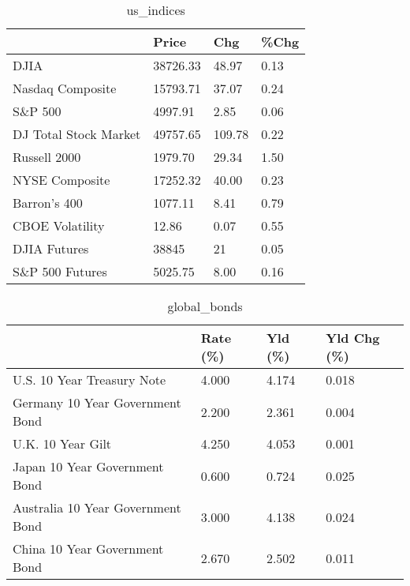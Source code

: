 \documentclass{article}%
\begin{document}
%


\begin{table}[htbp]%
\caption{us\_indices}%
\centering%
\begin{adjustbox}{width=1\textwidth}%
\begin{tabular}{llll}
\toprule
                      &    Price &    Chg & \%Chg \\
\midrule
                 DJIA & 38726.33 &  48.97 & 0.13 \\
     Nasdaq Composite & 15793.71 &  37.07 & 0.24 \\
              S\&P 500 &  4997.91 &   2.85 & 0.06 \\
DJ Total Stock Market & 49757.65 & 109.78 & 0.22 \\
         Russell 2000 &  1979.70 &  29.34 & 1.50 \\
       NYSE Composite & 17252.32 &  40.00 & 0.23 \\
         Barron's 400 &  1077.11 &   8.41 & 0.79 \\
      CBOE Volatility &    12.86 &   0.07 & 0.55 \\
         DJIA Futures &    38845 &     21 & 0.05 \\
      S\&P 500 Futures &  5025.75 &   8.00 & 0.16 \\
\bottomrule
\end{tabular}
%
\end{adjustbox}%
\end{table}

%


\begin{table}[htbp]%
\caption{global\_bonds}%
\centering%
\begin{adjustbox}{width=1\textwidth}%
\begin{tabular}{llll}
\toprule
                                  & Rate (\%) & Yld (\%) & Yld Chg (\%) \\
\midrule
       U.S. 10 Year Treasury Note &    4.000 &   4.174 &       0.018 \\
  Germany 10 Year Government Bond &    2.200 &   2.361 &       0.004 \\
                U.K. 10 Year Gilt &    4.250 &   4.053 &       0.001 \\
    Japan 10 Year Government Bond &    0.600 &   0.724 &       0.025 \\
Australia 10 Year Government Bond &    3.000 &   4.138 &       0.024 \\
    China 10 Year Government Bond &    2.670 &   2.502 &       0.011 \\
\bottomrule
\end{tabular}
%
\end{adjustbox}%
\end{table}
\end{document}
